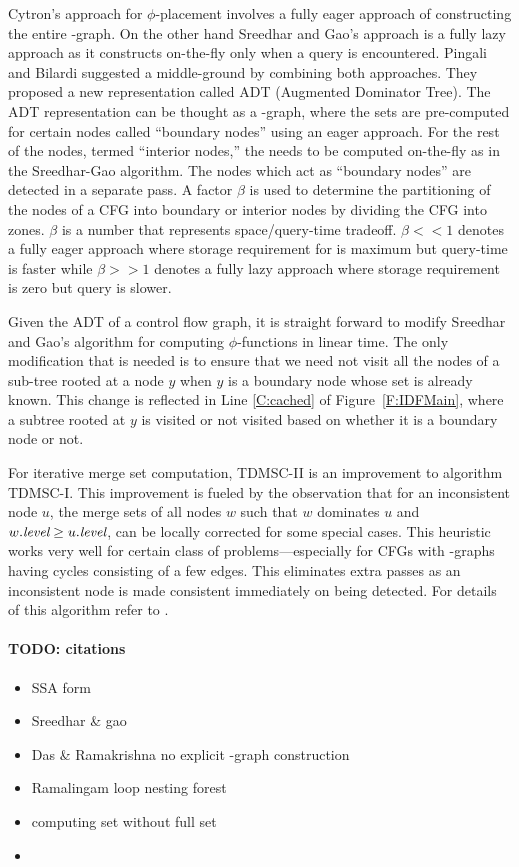 {Cytron's approach for $\phi$-placement involves a fully eager approach of constructing the entire \DF-graph. On the other hand Sreedhar and Gao's approach is a fully lazy approach as it constructs \DF on-the-fly only when a query is encountered.
Pingali and Bilardi \cite{bilardi} suggested a middle-ground by combining both 
approaches. They proposed a new representation called ADT (Augmented Dominator 
Tree). The ADT representation can be thought as a \DJ-graph, where the \DF sets 
are pre-computed for certain nodes called ``boundary nodes'' using an eager 
approach. For the rest of the nodes, termed ``interior nodes,'' the \DF needs 
to be computed on-the-fly as in the Sreedhar-Gao algorithm. The nodes which act 
as ``boundary nodes'' are detected in a separate pass. A factor $\beta$ is used 
to determine the partitioning of the nodes of a CFG into boundary or interior 
nodes by dividing the CFG into zones. $\beta$ is a number that represents 
space/query-time tradeoff. $\beta <\!\!< 1$ denotes a fully eager approach where 
storage requirement for \DF is maximum but query-time is faster while 
$\beta >\!\!> 1$ denotes a fully lazy approach where storage requirement is zero but 
query is 
slower. 

Given the ADT of a control flow graph, it is straight forward to 
modify  Sreedhar and Gao's algorithm for computing $\phi$-functions in linear time. The only modification that is needed is to ensure that we need not visit all the nodes of a sub-tree rooted at a node $y$ when $y$ is a boundary node whose \DF set is already known. This change is reflected in Line \ref{C:cached} of Figure~\ref{F:IDFMain}, where a subtree rooted at $y$ is visited or not visited based on whether it is a boundary node or not.

For iterative merge set computation, TDMSC-II is an improvement to algorithm 
TDMSC-I. This improvement is fueled by the observation that for an inconsistent 
node $u$, the merge sets of all nodes $w$ such that $w$ dominates $u$ and 
$w.\textit{level} \geq u.\textit{level}$,
can be locally corrected for some special cases. This
heuristic works very well for certain class of problems---especially for CFGs with \DF-graphs having cycles consisting of a few edges. This eliminates extra passes as an inconsistent node is made consistent immediately on being detected. For details of this algorithm refer to \cite{das}.


\paragraph{TODO: citations}
\begin{itemize}
  \item SSA form \cite{cfr}
  \item Sreedhar \& gao \cite{sreedhar_popl}
  \item Das \& Ramakrishna no explicit \DF-graph construction  \cite{das}
  \item Ramalingam loop nesting forest  \cite{rama}
  \item computing \iDF set without full \DF set \cite{sreedhar_popl,sreedharthesis}
  \item \cite{bilardi} 
\end{itemize}
}

